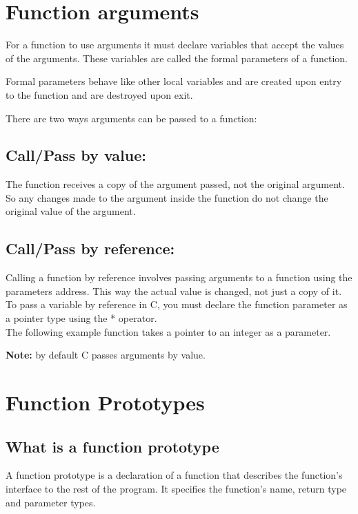 \documentclass[12pt, letterpaper]{report}
\begin{document}
\clearpage
\section{Function arguments}
For a function to use arguments it must declare variables that accept the values
of the arguments. These variables are called the formal parameters of a function.

Formal parameters behave like other local variables and are created upon entry
to the function and are destroyed upon exit.

There are two ways arguments can be passed to a function:

\subsection{Call/Pass by value:}
The function receives a copy of the argument passed, not the original argument.
So any changes made to the argument inside the function do not change the original
value of the argument.
		

\subsection{Call/Pass by reference:}
Calling a function by reference involves passing arguments to a function using
the parameters address. This way the actual value is changed, not just a copy
of it.\\

To pass a variable by reference in C, you must declare the function parameter 
as a pointer type using the * operator.\\


The following example function takes a pointer to an integer as a parameter.

\textbf{Note:} by default C passes arguments by value.
\clearpage


\section{Function Prototypes}

\subsection{What is a function prototype}
A function prototype is a declaration of a function that describes the function's
interface to the rest of the program. It specifies the function's name, return
type and parameter types.\\
\end{document}
